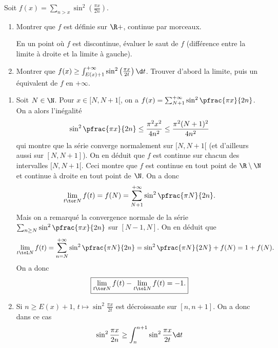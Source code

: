 \begin{enonce}
\begin{exercise}[ID={Cahier RMS 5, E109, Centrale},subtitle={},tags={}]
Soit $f(x)=\sum_{n>x}\sin^2\left( \frac{\pi x}{2n} \right) $.
\begin{enumerate}
\item Montrer que $f$ est définie sur $\R+$, continue par morceaux. 
    
    En un point où $f$ est discontinue, évaluer le saut de $f$ (différence entre la limite à droite et la limite à gauche).
\item Montrer que $f(x)\geq \int_{E(x)+1}^{+\infty} \sin^2\left( \frac{\pi x}{2t} \right) \d t$. Trouver d'abord la limite, puis un équivalent de $f$ en $+\infty$.
\end{enumerate}
\end{exercise}
\begin{solution}
\begin{enumerate}
\item Soit $N\in\N$. Pour $x\in[N,N+1[$, on a $f(x)=\sum_{N+1}^{+\infty}\sin^2\pfrac{\pi x}{2n}$. On a alors l'inégalité
\begin{equation*}
    \sin^2\pfrac{\pi x}{2n}\leq \frac{\pi^2 x^2}{4n^2}\leq \frac{\pi^2 (N+1)^2}{4n^2}
\end{equation*}
qui montre que la série converge normalement sur $[N,N+1[$ (et d'ailleurs aussi sur $[N,N+1]$). On en déduit que $f$ est continue sur chacun des intervalles $[N,N+1[$. Ceci montre que $f$ est continue en tout point de $\R\setminus\N$ et continue à droite en tout point de $\N$. On a donc
\begin{equation*}
    \lim_{t\tor N} f(t)=f(N)=\sum_{N+1}^{+\infty}\sin^2\pfrac{\pi N}{2n}.
\end{equation*}
Mais on a remarqué la convergence normale de la série $\sum_{n\geq N}\sin^2\pfrac{\pi x}{2n}$ sur $[N-1,N]$. On en déduit que
\begin{equation*}
    \lim_{t\tol N} f(t)=\sum_{n=N}^{+\infty}\sin^2\pfrac{\pi N}{2n} =\sin^2\pfrac{\pi N}{2N} + f(N)=1+f(N).
\end{equation*}
On a donc
\begin{equation*}
    \boxed{ \lim_{t\tor N} f(t) - \lim_{t\tol N} f(t) = -1.}
\end{equation*}
\item Si $n\geq E(x)+1$, $t\mapsto\sin^2\frac{\pi x}{2t}$ est décroissante sur $[n,n+1]$. On a donc dans ce cas
\begin{equation*}
    \sin^2\frac{\pi x}{2n} \geq \int_n^{n+1}\sin^2\frac{\pi x}{2t}\d t

\end{equation*}
\end{enumerate}
\end{solution}
\end{enonce}

